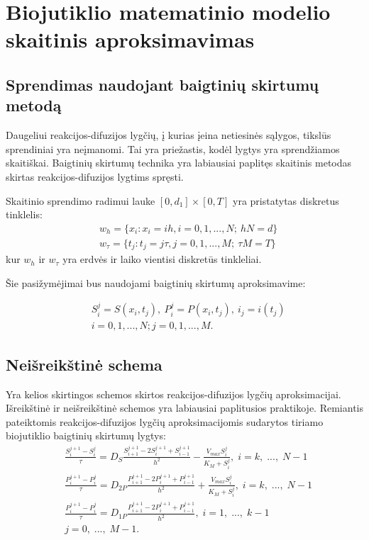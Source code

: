 \documentclass[12pt, a4paper, lithuanian]{article}
\begin{document}
\section{Biojutiklio matematinio modelio skaitinis aproksimavimas}
\subsection{Sprendimas naudojant baigtinių skirtumų metodą}

Daugeliui reakcijos-difuzijos lygčių, į kurias įeina netiesinės sąlygos,
tikslūs sprendiniai yra neįmanomi. Tai yra priežastis, kodėl lygtys yra
sprendžiamos skaitiškai. Baigtinių skirtumų technika yra labiausiai paplitęs
skaitinis metodas skirtas reakcijos-difuzijos lygtims spręsti\cite{baronas2009mathematical}.

Skaitinio sprendimo radimui lauke $[0,d_1]\times[0,T]$ yra pristatytas
diskretus tinklelis:
\begin{equation}
\begin{aligned}
    &w_h = \{x_i : x_i = ih, i = 0, 1, ..., N;\ hN = d\} \\
    &w_{\tau} = \{t_j : t_j = j \tau, j = 0, 1, ..., M;\ \tau M = T\}
\end{aligned}
\end{equation}
kur $w_h$ ir $w_{\tau}$ yra erdvės ir laiko vientisi diskretūs tinkleliai.

Šie pasižymėjimai bus naudojami baigtinių skirtumų aproksimavime:

\begin{equation}
    \begin{aligned}
        &S^j_i = S(x_i,t_j), \ P^j_i = P(x_i,t_j), \ i_j = i(t_j) \\ 
        &i = 0, 1, ..., N; j = 0, 1, ..., M.
    \end{aligned}
\end{equation}

\subsection{Neišreikštinė schema}

Yra kelios skirtingos schemos skirtos reakcijos-difuzijos lygčių
aproksimacijai. Išreikštinė ir neišreikštinė schemos yra labiausiai paplitusios
praktikoje. Remiantis \cite{baronas2009mathematical} pateiktomis
reakcijos-difuzijos lygčių aproksimacijomis sudarytos tiriamo biojutiklio baigtinių skirtumų lygtys:
\begin{equation}
\begin{aligned} 
    &\frac{S_i^{j+1} - S_i^j}{\tau} = D_S\frac{S_{i+1}^{j+1} -
    2S_i^{j+1} + S_{i-1}^{j+1}}{h^2} -
    \frac{V_{max} S_i^j}{K_M + S_i^j},\;i = k,\;...,\;N-1\\ 
    &\frac{P_i^{j+1} - P_i^j}{\tau} = D_{2P}\frac{P_{i+1}^{j+1} -
    2P_i^{j+1} + P_{i-1}^{j+1}}{h^2} +
    \frac{V_{max} S_i^j}{K_M + S_i^j},\;i = k,\;...,\;N-1\\ 
    &\frac{P_i^{j+1} - P_i^j}{\tau} = D_{1P}\frac{P_{i+1}^{j+1} -
    2P_i^{j+1} + P_{i-1}^{j+1}}{h^2}, \;i = 1,\;...,\;k-1\\ 
    &j=0,\;...,\;M-1.
\end{aligned}
\end{equation}
\end{document}
